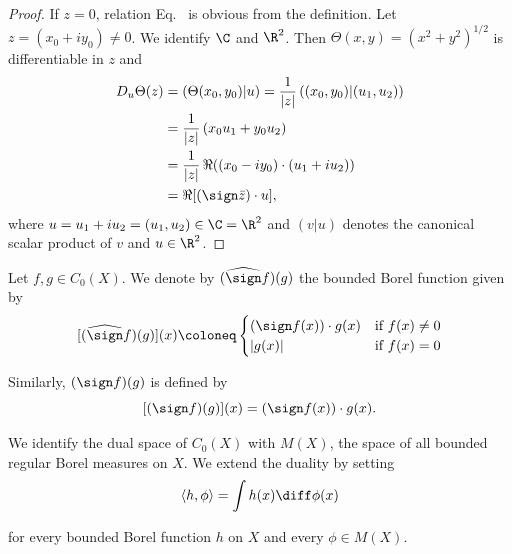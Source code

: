 \begin{proof}
If\/ $z = 0$, relation Eq.~ is obvious from the definition.
Let $z = (x_{0} + iy_{0}) \neq 0$.
We identify $\C$ and $\R^2$.
Then $\Theta(x,y) = (x^2 + y^2)^{1/2}$ is differentiable in $z$ and
\begin{align*}
D_{u}\Theta(z) &= (\Theta(x_{0},y_{0})|u) = \frac{1}{|z|}\, ((x_{0},y_{0})|(u_{1},u_{2}))  \\
               &= \frac{1}{|z|}\, (x_{0}u_{1} + y_{0}u_{2}) \\
               &= \frac{1}{|z|}\, \Re((x_{0}-iy_{0})\cdot(u_{1}+iu_{2})) \\
               &= \Re[(\sign \bar{z})\cdot u],
\end{align*}
where $u = u_{1} + iu_{2} = (u_{1},u_{2}) \in \C = \R^2$ and $(v|u)$ denotes the canonical scalar product of\/ 
$v$ and $u \in \R^2$.
\end{proof}
Let $f, g \in C_{0}(X)$.
We denote by $(\widehat{\sign} f)(g)$ the bounded Borel function given by
\begin{equation}\label{eq:b2-2.7}
[(\widehat{\sign} f)(g)](x) \coloneq \begin{cases}
    (\sign f(x))\cdot g(x) & \text{if } f(x) \neq 0 \\
    |g(x)| & \text{if } f(x) = 0
\end{cases}
\end{equation}

Similarly, $(\sign f)(g)$ is defined by
\begin{equation}\label{eq:b2-2.8}
[(\sign f)(g)](x) = ({\sign} f(x))\cdot g(x).
\end{equation}

We identify the dual space of\/ $C_{0}(X)$ with $M(X)$, the space of all bounded regular Borel measures on $X$.
We extend the duality by setting
\begin{equation*}
\langle h,\phi \rangle = \int h(x)   \diff\phi(x)
\end{equation*}

for every bounded Borel function $h$ on $X$ and every $\phi \in M(X)$.

